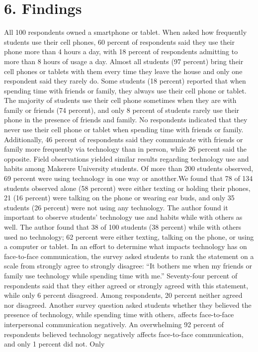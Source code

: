\documentclass[11pt]{article} %
\begin{document}
\section{6. Findings}
All 100 respondents owned a smartphone or tablet. When asked how frequently students use their 
cell phones, 60 percent of respondents said they use their phone more than 4 hours a day, with 18 percent of respondents 
admitting to more than 8 hours of usage a day. Almost all students (97 percent) bring their cell phones or tablets 
with them every time they leave the house and only one respondent said they rarely do. Some students 
(18 percent) reported that when spending time with friends or family, they always use their cell phone or tablet. The 
majority of students use their cell phone sometimes when they are with family or friends (74 percent), and only 8 percent 
of students rarely use their phone in the presence of friends and family. No respondents indicated that they 
never use their cell phone or tablet when spending time with friends or family. Additionally, 46 percent of respondents
said they communicate with friends or family more frequently via technology than in person, while 
26 percent said the opposite.  
Field observations yielded similar results regarding technology use and habits among Makerere University students. 
Of more than 200 students observed, 69 percent were using technology in one way or anotther.We found 
that 78 of 134 students observed alone (58 percent) were either texting or holding their phones, 21 (16 percent) were talking
on the phone or wearing ear buds, and only 35 students (26 percent) were not using any technology. 
The author found it important to observe students’ technology use and habits while with others as 
well. The author found that 38 of 100 students (38 percent) while with others used no technology; 62 percent were either 
texting, talking on the phone, or using a computer or tablet. 
In an effort to determine what impacts technology has on face-to-face communication, the survey 
asked students to rank the statement on a scale from strongly agree to strongly disagree: “It bothers me when 
my friends or family use technology while spending time with me.” Seventy-four percent of respondents said 
that they either agreed or strongly agreed with this statement, while only 6 percent disagreed. Among respondents, 
20 percent  neither agreed nor disagreed. 
Another survey question asked students whether they believed the presence of technology, while spending time with others, affects face-to-face interpersonal communication negatively. An overwhelming 92 percent of respondents believed technology negatively affects face-to-face communication, and only 1 percent did not. Only 
\end{document}
